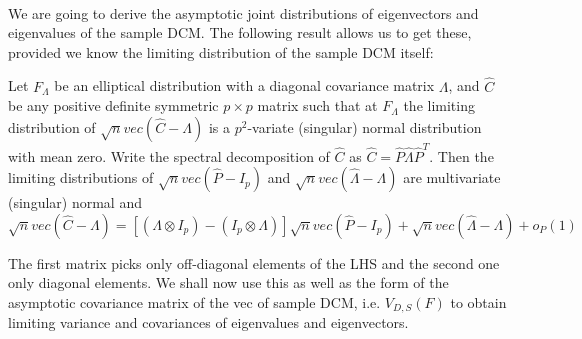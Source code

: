 \documentclass[fleqn,12pt]{article}
\begin{document}
\paragraph{}We are going to derive the asymptotic joint distributions of eigenvectors and eigenvalues of the sample DCM. The following result allows us to get these, provided we know the limiting distribution of the sample DCM itself:

\begin{Theorem} \label{Theorem:decomp} \citep{taskinen12}
Let $F_\Lambda$ be an elliptical distribution with a diagonal covariance matrix $\Lambda$, and $\hat C$ be any positive definite symmetric $p \times p$ matrix such that at $F_\Lambda$ the limiting distribution of $\sqrt n vec(\hat C - \Lambda)$ is a $p^2$-variate (singular) normal distribution with mean zero. Write the spectral decomposition of $\hat C$ as $\hat C = \hat P \hat\Lambda \hat P^T$. Then the limiting distributions of $\sqrt n vec(\hat P - I_p)$ and $\sqrt n vec(\hat\Lambda - \Lambda)$ are multivariate (singular) normal and
\begin{equation} \label{equation:decompEq}
\sqrt n vec (\hat C - \Lambda)  = \left[ (\Lambda \otimes I_p) - (I_p \otimes \Lambda) \right] \sqrt n vec (\hat P - I_p) + \sqrt n vec (\hat\Lambda - \Lambda) + o_P(1)
\end{equation}
\end{Theorem}

The first matrix picks only off-diagonal elements of the LHS and the second one only diagonal elements. We shall now use this as well as the form of the asymptotic covariance matrix of the vec of sample DCM, i.e. $V_{D,S}(F)$ to obtain limiting variance and covariances of eigenvalues and eigenvectors.
\end{document}
